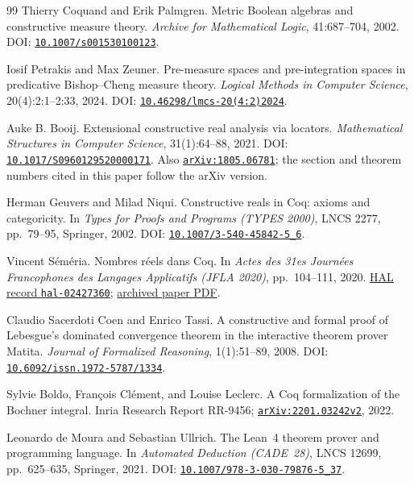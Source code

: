 \documentclass[11pt]{article}
\theoremstyle{definition}
\theoremstyle{remark}
\newcommand{\doi}[1]{\href{https://doi.org/#1}{\texttt{#1}}}
\begin{document}
\begin{thebibliography}{99}
Thierry Coquand and Erik Palmgren.
\newblock Metric Boolean algebras and constructive measure theory.
\newblock \emph{Archive for Mathematical Logic}, 41:687--704, 2002.
\newblock DOI: \doi{10.1007/s001530100123}.

Iosif Petrakis and Max Zeuner.
\newblock Pre-measure spaces and pre-integration spaces in predicative Bishop--Cheng measure theory.
\newblock \emph{Logical Methods in Computer Science}, 20(4):2:1--2:33, 2024.
\newblock DOI: \doi{10.46298/lmcs-20(4:2)2024}.

Auke B. Booij.
\newblock Extensional constructive real analysis via locators.
\newblock \emph{Mathematical Structures in Computer Science}, 31(1):64--88, 2021.
\newblock DOI: \doi{10.1017/S0960129520000171}.
\newblock Also \href{https://arxiv.org/abs/1805.06781}{\texttt{arXiv:1805.06781}}; the section and theorem numbers cited in this paper follow the arXiv version.

Herman Geuvers and Milad Niqui.
\newblock Constructive reals in Coq: axioms and categoricity.
\newblock In \emph{Types for Proofs and Programs (TYPES 2000)}, LNCS 2277, pp.~79--95, Springer, 2002.
\newblock DOI:
\href{https://doi.org/10.1007/3-540-45842-5_6}{\texttt{10.1007/3-540-45842-5\_6}}.

Vincent S\'em\'eria.
\newblock Nombres r\'eels dans Coq.
\newblock In \emph{Actes des 31es Journ\'ees Francophones des Langages Applicatifs (JFLA 2020)}, pp.~104--111, 2020.
\newblock \href{https://inria.hal.science/hal-02427360}{HAL record \texttt{hal-02427360}};
\href{https://inria.hal.science/hal-02427360v1/document}{archived paper PDF}.

Claudio Sacerdoti Coen and Enrico Tassi.
\newblock A constructive and formal proof of Lebesgue's dominated convergence theorem in the interactive theorem prover Matita.
\newblock \emph{Journal of Formalized Reasoning}, 1(1):51--89, 2008.
\newblock DOI: \doi{10.6092/issn.1972-5787/1334}.

Sylvie Boldo, Fran\c{c}ois Cl\'ement, and Louise Leclerc.
\newblock A Coq formalization of the Bochner integral.
\newblock Inria Research Report RR-9456;
\href{https://arxiv.org/abs/2201.03242}{\texttt{arXiv:2201.03242v2}}, 2022.

Leonardo de Moura and Sebastian Ullrich.
\newblock The Lean~4 theorem prover and programming language.
\newblock In \emph{Automated Deduction (CADE~28)}, LNCS 12699, pp.~625--635, Springer, 2021.
\newblock DOI:
\href{https://doi.org/10.1007/978-3-030-79876-5_37}{\texttt{10.1007/978-3-030-79876-5\_37}}.


\end{thebibliography}
\end{document}
